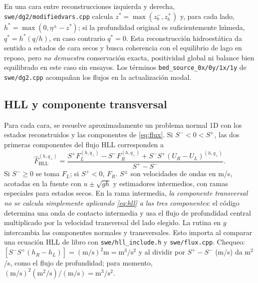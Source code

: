 \documentclass[11pt,a4paper]{article}
\newcommand{\src}[1]{\nolinkurl{#1}}
\newcommand{\unit}[1]{\mathrm{#1}}
\begin{document}
En una cara entre reconstrucciones izquierda y derecha, \src{swe/dg2/modifiedvars.cpp} calcula $z^*=\max(z_b^-,z_b^+)$ y, para cada lado, $h^*=\max(0,\eta^{\pm}-z^*)$; si la profundidad original es suficientemente húmeda, $q^*=h^*(q/h)$, en caso contrario $q^*=0$. Esta reconstrucción hidroestática da sentido a estados de cara secos y busca coherencia con el equilibrio de lago en reposo, pero \emph{no demuestra} conservación exacta, positividad global ni balance bien equilibrado en este caso sin ensayos. Los términos \texttt{bed\_source\_0x/0y/1x/1y} de \src{swe/dg2.cpp} acompañan los flujos en la actualización modal.

\subsection{HLL y componente transversal}
Para cada cara, se resuelve aproximadamente un problema normal 1D con los estados reconstruidos y las componentes de \eqref{eq:flux}. Si $S^-<0<S^+$, las dos primeras componentes del flujo HLL corresponden a
\begin{equation}
 \widehat F_{\mathrm{HLL}}^{(h,q_\perp)}=
 \frac{S^+F_L^{(h,q_\perp)}-S^-F_R^{(h,q_\perp)}
       +S^-S^+(U_R-U_L)^{(h,q_\perp)}}{S^+-S^-}.\label{eq:hll}
\end{equation}
Si $S^-\geq0$ se toma $F_L$; si $S^+<0$, $F_R$. $S^{\pm}$ son velocidades de ondas en m/s, acotadas en la fuente con $u\pm\sqrt{gh}$ y estimadores intermedios, con ramas especiales para estados secos. En la rama intermedia, \emph{la componente transversal no se calcula simplemente aplicando \eqref{eq:hll} a las tres componentes}: el código determina una onda de contacto intermedia y usa el flujo de profundidad central multiplicado por la velocidad transversal del lado elegido. La rutina en $y$ intercambia las componentes normales y transversales. Esto importa al comparar una ecuación HLL de libro con \src{swe/hll_include.h} y \src{swe/flux.cpp}. Chequeo: $[S^-S^+(h_R-h_L)]=\unit{(m/s)^2m}=\unit{m^3/s^2}$ y al dividir por $S^+-S^-$ (m/s) da m$^2$/s, como el flujo de profundidad; para momento, $(\unit{m/s})^2(\unit{m^2/s})/(\unit{m/s})=\unit{m^3/s^2}$.
\end{document}
